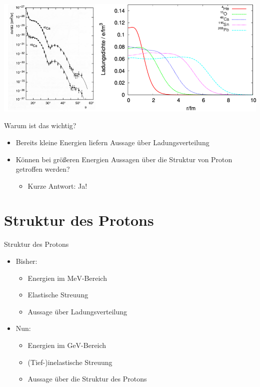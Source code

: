 \documentclass[aspectratio=1610, 9pt]{beamer}
\begin{document}
\begin{frame}
\centering
  \includegraphics[scale=0.4]{images/Ladungsverteilung.png}
\end{frame}

\begin{frame}{Warum ist das wichtig?}
  \begin{itemize}
    \item{Bereits kleine Energien liefern Aussage über Ladungsverteilung}
    \item{Können bei größeren Energien Aussagen über die Struktur von Proton getroffen werden?}
    \begin{itemize}
      \item{Kurze Antwort: Ja!}
    \end{itemize}
  \end{itemize}
\end{frame}

\section{Struktur des Protons}


\begin{frame}{Struktur des Protons}
  \begin{itemize}
    \item{Bisher:}
    \begin{itemize}
      \item{Energien im $\mathrm{MeV}$-Bereich }
      \item{Elastische Streuung}
      \item{Aussage über Ladungsverteilung}
    \end{itemize}
    \item{Nun:}
    \begin{itemize}
      \item{Energien im $\mathrm{GeV}$-Bereich}
      \item{(Tief-)inelastische Streuung}
      \item{Aussage über die Struktur des Protons}
    \end{itemize}
  \end{itemize}
\end{frame}
\end{document}

